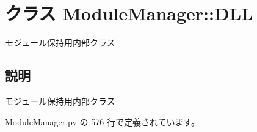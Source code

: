 \section{クラス ModuleManager::DLL}
\label{classsource__py_1_1_module_manager_1_1_module_manager_1_1_d_l_l}
モジュール保持用内部クラス  




\subsection{説明}
モジュール保持用内部クラス 

 ModuleManager.py の 576 行で定義されています。